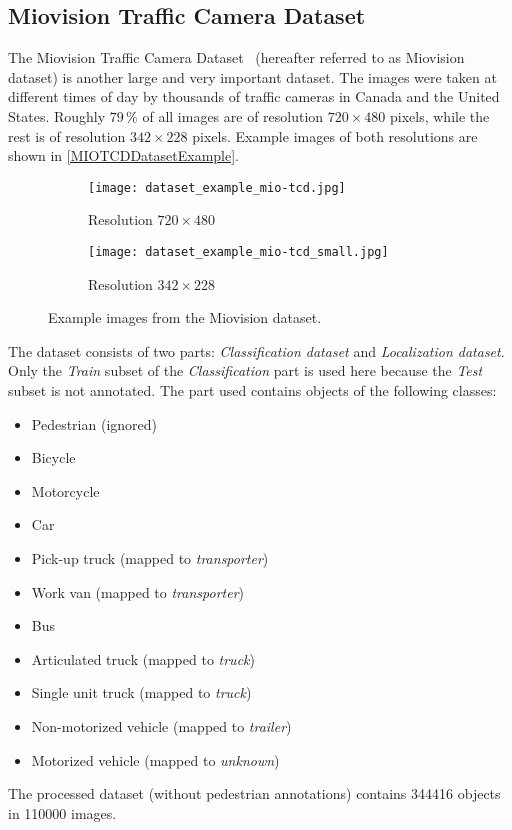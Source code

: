 \subsection{Miovision Traffic Camera Dataset}

The Miovision Traffic Camera Dataset~\cite{MIO2018} (hereafter referred to
as Miovision dataset) is another large and very important dataset. The images
were taken at different times of day by thousands of traffic cameras in Canada
and the United States. Roughly $79\,\%$ of all images are of resolution $720
\times 480$ pixels, while the rest is of
resolution $342 \times 228$ pixels. Example images of both resolutions are shown
in \autoref{MIOTCDDatasetExample}.

\begin{figure}[t]
    \centering
    \begin{subfigure}[b]{0.475\textwidth}
        \texttt{[image: dataset\_example\_mio-tcd.jpg]}
        \caption{Resolution $720 \times 480$}
    \end{subfigure}
    \begin{subfigure}[b]{0.475\textwidth}
        \texttt{[image: dataset\_example\_mio-tcd\_small.jpg]}
        \caption{Resolution $342 \times 228$}
    \end{subfigure}
    \caption{Example images from the Miovision dataset.}
    \label{MIOTCDDatasetExample}
\end{figure}

The dataset consists of two parts: \textit{Classification dataset} and
\textit{Localization dataset}. Only the \textit{Train} subset of the
\textit{Classification} part is used here because the \textit{Test} subset is
not annotated. The part used contains objects of the following classes:
\begin{itemize}
    \item Pedestrian (ignored)
    \item Bicycle
    \item Motorcycle
    \item Car
    \item Pick-up truck (mapped to \textit{transporter})
    \item Work van (mapped to \textit{transporter})
    \item Bus
    \item Articulated truck (mapped to \textit{truck})
    \item Single unit truck (mapped to \textit{truck})
    \item Non-motorized vehicle (mapped to \textit{trailer})
    \item Motorized vehicle (mapped to \textit{unknown})
\end{itemize}
The processed dataset (without pedestrian annotations) contains \num{344416}
objects in \num{110000} images.


